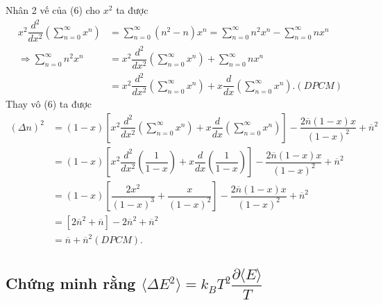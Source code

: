 \documentclass{article}
\newcommand{\f}[2]{\dfrac{#1}{#2}}
\begin{document}
Nhân 2 vế của (6) cho $x^2$ ta được
\begin{align*}
	x^2 \f{d^2}{dx^2} \left( \sum_{n = 0}^{\infty} x^{n} \right)
	 & = \sum_{n = 0}^{\infty} (n^2-n) x^{n}
	= \sum_{n = 0}^{\infty} n^2 x^{n} - \sum_{n = 0}^{\infty} nx^{n}                                                                           \\
	\Rightarrow \sum_{n = 0}^{\infty} n^2 x^{n}
	 & = x^2 \f{d^2}{dx^2} \left( \sum_{n = 0}^{\infty} x^{n} \right) + \sum_{n = 0}^{\infty} nx^{n}                                           \\
	 & = x^2 \f{d^2}{dx^2} \left( \sum_{n = 0}^{\infty} x^{n} \right) + x \f{d}{dx} \left( \sum_{n = 0}^{\infty} x^{n} \right) .(DPCM) \tag{8}
\end{align*}
Thay vô (6) ta được
\begin{align*}
	(\Delta n)^2
	 & = (1-x) \left[x^2 \f{d^2}{dx^2} \left( \sum_{n = 0}^{\infty} x^{n} \right) + x \f{d}{dx} \left( \sum_{n = 0}^{\infty} x^{n} \right)\right] - \f{2\overline{n}(1-x)x}{(1 - x)^2} + \overline{n}^2 \\
	 & = (1-x) \left[x^2 \f{d^2}{dx^2} \left( \f{1}{1 - x} \right) + x \f{d}{dx} \left( \f{1}{1 - x} \right)\right] - \f{2\overline{n}(1-x)x}{(1 - x)^2} + \overline{n}^2                               \\
	 & = (1-x) \left[\f{2x^2}{(1-x)^3} + \f{x}{(1 - x)^2}\right] - \f{2\overline{n}(1-x)x}{(1 - x)^2} + \overline{n}^2                                                                                  \\
	 & = \left[2 \overline{n}^2 + \overline{n}\right] - 2 \overline{n}^2 + \overline{n}^2                                                                                                               \\
	 & = \overline{n} + \overline{n}^2 (DPCM).\tag{9}
\end{align*}

\subsection*{Chứng minh rằng $\langle \Delta E^2 \rangle = k_B T^2 \f{\partial \langle E \rangle}{T}$}
\end{document}
